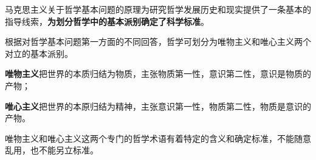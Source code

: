 {马克思主义关于哲学基本问题的原理为研究哲学发展历史和现实提供了一条基本的指导线索，\textbf{{为划分哲学中的基本派别确定了科学标准}}。}

{根据对哲学基本问题第一方面的不同回答，哲学可划分为唯物主义和唯心主义两个对立的基本派别。}

{{\textbf{唯物主义}}{把世界的本质归结为物质，主张物质第一性，意识第二性，意识是物质的产物；}}

{{\textbf{唯心主义}}{把世界的本原归结为精神，主张意识第一性，物质第二性，物质是意识的产物。}}

{唯物主义和唯心主义这两个专门的哲学术语有着特定的含义和确定标准，不能随意乱用，也不能另立标准。~
~~}
